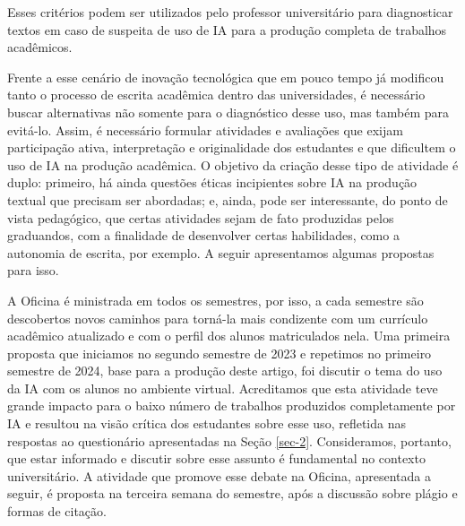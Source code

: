 \documentclass[portuguese]{textolivre}
\begin{document}
Esses critérios podem ser utilizados pelo professor universitário para diagnosticar textos em caso de suspeita de uso de IA para a produção completa de trabalhos acadêmicos.

Frente a esse cenário de inovação tecnológica que em pouco tempo já modificou tanto o processo de escrita acadêmica dentro das universidades, é necessário buscar alternativas não somente para o diagnóstico desse uso, mas também para evitá-lo. Assim, é necessário formular atividades e avaliações que exijam participação ativa, interpretação e originalidade dos estudantes e que dificultem o uso de IA na produção acadêmica. O objetivo da criação desse tipo de atividade é duplo: primeiro, há ainda questões éticas incipientes sobre IA na produção textual que precisam ser abordadas; e, ainda, pode ser interessante, do ponto de vista pedagógico, que certas atividades sejam de fato produzidas pelos  
graduandos, com a finalidade de desenvolver certas habilidades, como a autonomia de escrita, por exemplo. A seguir apresentamos algumas propostas para isso.

A Oficina é ministrada em todos os semestres, por isso, a cada semestre são descobertos novos caminhos para torná-la mais condizente com um currículo acadêmico atualizado e com o perfil dos alunos matriculados nela. Uma primeira proposta que iniciamos no segundo semestre de 2023 e repetimos no primeiro semestre de 2024, base para a produção deste artigo, foi discutir o tema do uso da IA com os alunos no ambiente virtual. Acreditamos que esta atividade teve grande impacto para o baixo número de trabalhos produzidos completamente por IA e resultou na visão crítica dos estudantes sobre esse uso, refletida nas respostas ao questionário apresentadas na Seção \ref{sec-2}. Consideramos, portanto, que estar informado e discutir sobre esse assunto é fundamental no contexto universitário. A atividade que promove esse debate na Oficina, apresentada a seguir, é proposta na terceira semana do semestre, após a discussão sobre plágio e formas de citação.

\end{document}
